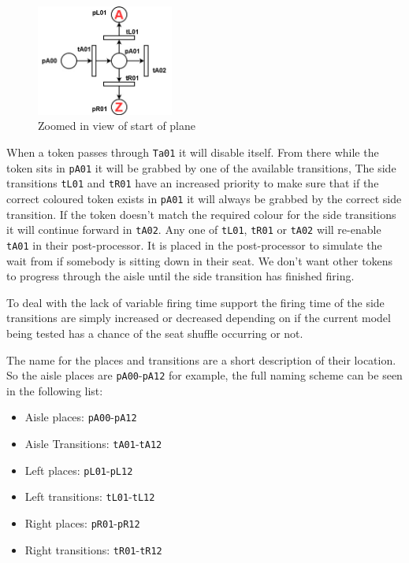 \documentclass[english]{article}
\begin{document}
\begin{figure}[H]
    \centering
    \includegraphics[width=0.4\textwidth]{figures/plane zoom.jpg}
    \caption{Zoomed in view of start of plane}
    \label{fig:plane_zoom}
\end{figure}

When a token passes through \lstinline{Ta01} it will disable itself. From there while the token sits in \lstinline{pA01} it will be grabbed by one of the available transitions, The side transitions \lstinline{tL01} and \lstinline{tR01} have an increased priority to make sure that if the correct coloured token exists in \lstinline{pA01} it will always be grabbed by the correct side transition. If the token doesn't match the required colour for the side transitions it will continue forward in \lstinline{tA02}. Any one of \lstinline{tL01}, \lstinline{tR01} or \lstinline{tA02} will re-enable \lstinline{tA01} in their post-processor. It is placed in the post-processor to simulate the wait from if somebody is sitting down in their seat. We don't want other tokens to progress through the aisle until the side transition has finished firing.

To deal with the lack of variable firing time support the firing time of the side transitions are simply increased or decreased depending on if the current model being tested has a chance of the seat shuffle occurring or not. 

The name for the places and transitions are a short description of their location. So the aisle places are \lstinline{pA00}-\lstinline{pA12} for example, the full naming scheme can be seen in the following list:

\begin{itemize}
    \item Aisle places: \lstinline{pA00}-\lstinline{pA12}
    \item Aisle Transitions: \lstinline{tA01}-\lstinline{tA12}
    \item Left places: \lstinline{pL01}-\lstinline{pL12}
    \item Left transitions: \lstinline{tL01}-\lstinline{tL12}
    \item Right places: \lstinline{pR01}-\lstinline{pR12}
    \item Right transitions: \lstinline{tR01}-\lstinline{tR12}
\end{itemize}
\end{document}
